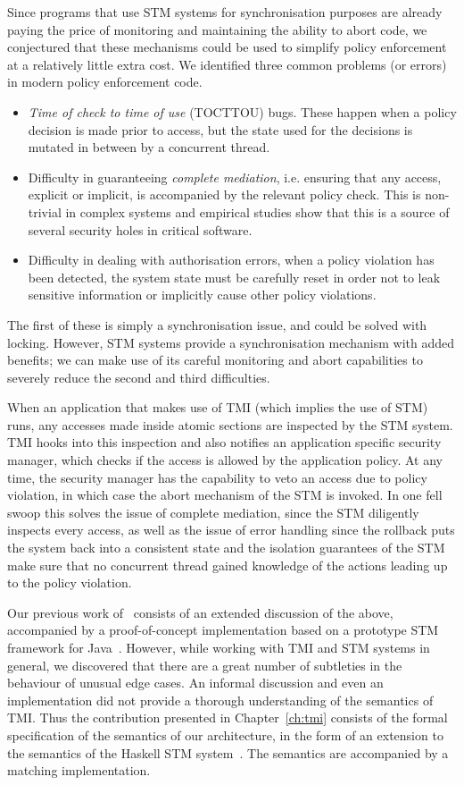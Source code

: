 Since programs that use STM systems for synchronisation purposes are already paying
the price of monitoring and maintaining the ability to abort code, we conjectured
that these mechanisms could be used to simplify policy enforcement at a relatively
little extra cost. We identified three common problems (or errors) in modern policy
enforcement code.
\begin{itemize}
    \item \emph{Time of check to time of use} (TOCTTOU) bugs. These happen when
    a policy decision is made prior to access, but the state used for the decisions
    is mutated in between by a concurrent thread.
    \item Difficulty in guaranteeing \emph{complete mediation}, i.e. ensuring that
    any access, explicit or implicit, is accompanied by the relevant policy check.
    This is non-trivial in complex systems and empirical studies show that this
    is a source of several security holes in critical software.
    \item Difficulty in dealing with authorisation errors, when a policy violation
    has been detected, the system state must be carefully reset in order not to leak
    sensitive information or implicitly cause other policy violations.
\end{itemize}
The first of these is simply a synchronisation issue, and could be solved with locking.
However, STM systems provide a synchronisation mechanism with added benefits; we
can make use of its careful monitoring and abort capabilities to severely reduce
the second and third difficulties.

When an application that makes use of TMI (which implies the use of STM) runs,
any accesses made inside atomic sections are inspected by the STM system. TMI
hooks into this inspection and also notifies an application specific security
manager, which checks if the access is allowed by the application policy. At any
time, the security manager has the capability to veto an access due to policy
violation, in which case the abort mechanism of the STM is invoked. In one fell
swoop this solves the issue of complete mediation, since the STM diligently
inspects every access, as well as the issue of error handling since the rollback
puts the system back into a consistent state and the isolation guarantees of the
STM make sure that no concurrent thread gained knowledge of the actions leading
up to the policy violation.

Our previous work of~\cite{tmi} consists of an extended discussion of the above,
accompanied by a proof-of-concept implementation based on a prototype STM framework
for Java~\cite{hlm06}. However, while working with TMI and STM systems in general,
we discovered that there are a great number of subtleties in the behaviour of
unusual edge cases. An informal discussion and even an implementation did not
provide a thorough understanding of the semantics of TMI. Thus the contribution
presented in Chapter~\ref{ch:tmi} consists of the formal specification of the semantics
of our architecture, in the form of an extension to the semantics of the Haskell
STM system~\cite{haskellstm}. The semantics are accompanied by a matching implementation.

